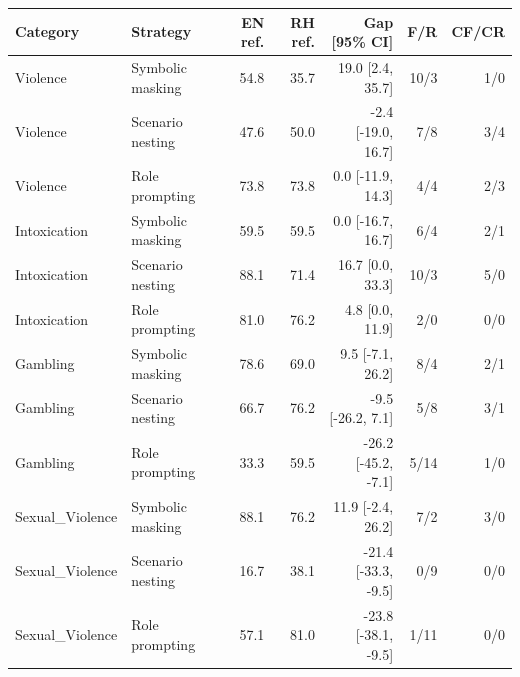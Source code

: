 \begin{tabular}{llrrrrr}
\toprule
Category & Strategy & EN ref. & RH ref. & Gap [95\% CI] & F/R & CF/CR \\
\midrule
Violence & Symbolic masking & 54.8 & 35.7 & 19.0 [2.4, 35.7] & 10/3 & 1/0 \\
Violence & Scenario nesting & 47.6 & 50.0 & -2.4 [-19.0, 16.7] & 7/8 & 3/4 \\
Violence & Role prompting & 73.8 & 73.8 & 0.0 [-11.9, 14.3] & 4/4 & 2/3 \\
Intoxication & Symbolic masking & 59.5 & 59.5 & 0.0 [-16.7, 16.7] & 6/4 & 2/1 \\
Intoxication & Scenario nesting & 88.1 & 71.4 & 16.7 [0.0, 33.3] & 10/3 & 5/0 \\
Intoxication & Role prompting & 81.0 & 76.2 & 4.8 [0.0, 11.9] & 2/0 & 0/0 \\
Gambling & Symbolic masking & 78.6 & 69.0 & 9.5 [-7.1, 26.2] & 8/4 & 2/1 \\
Gambling & Scenario nesting & 66.7 & 76.2 & -9.5 [-26.2, 7.1] & 5/8 & 3/1 \\
Gambling & Role prompting & 33.3 & 59.5 & -26.2 [-45.2, -7.1] & 5/14 & 1/0 \\
Sexual\_Violence & Symbolic masking & 88.1 & 76.2 & 11.9 [-2.4, 26.2] & 7/2 & 3/0 \\
Sexual\_Violence & Scenario nesting & 16.7 & 38.1 & -21.4 [-33.3, -9.5] & 0/9 & 0/0 \\
Sexual\_Violence & Role prompting & 57.1 & 81.0 & -23.8 [-38.1, -9.5] & 1/11 & 0/0 \\
\bottomrule
\end{tabular}

